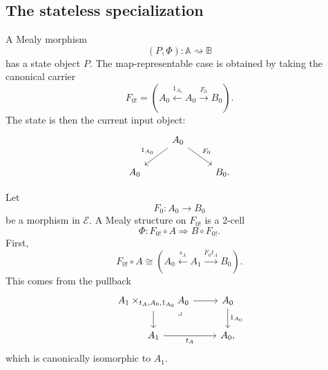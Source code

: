\subsection{The stateless specialization}
\label{subsec:stateless-mealy-morphisms}

A Mealy morphism
\[
    (P,\Phi):\mathbb A\rightsquigarrow\mathbb B
\]
has a state object \(P\). The map-representable case is obtained by taking the canonical carrier
\[
    F_{0!}
    =
    \left(
        A_0
        \xleftarrow{1_{A_0}}
        A_0
        \xrightarrow{F_0}
        B_0
    \right).
\]
The state is then the current input object:
\[
    \begin{tikzcd}
        & 
            A_0 
                \arrow[dl, "1_{A_0}"'] 
                \arrow[dr, "F_0"] 
        & 
        \\
            A_0 
        &
        & 
            B_0.
    \end{tikzcd}
\]

Let
\[
    F_0:A_0\to B_0
\]
be a morphism in \(\mathcal E\). A Mealy structure on \(F_{0!}\) is a 2-cell
\[
    \Phi:F_{0!}\circ A\Rightarrow B\circ F_{0!}.
\]
First,
\[
    F_{0!}\circ A
    \cong
    \left(
        A_0
        \xleftarrow{s_A}
        A_1
        \xrightarrow{F_0t_A}
        B_0
    \right).
\]
This comes from the pullback
\[
    \begin{tikzcd}
            A_1\times_{t_A,A_0,1_{A_0}}A_0
                \arrow[r]
                \arrow[d]
                \arrow[dr, phantom, "\lrcorner", very near start]
        &
            A_0 
                \arrow[d, "1_{A_0}"]
        \\
            A_1 
                \arrow[r, "t_A"']
        &
            A_0,
    \end{tikzcd}
\]
which is canonically isomorphic to \(A_1\).


